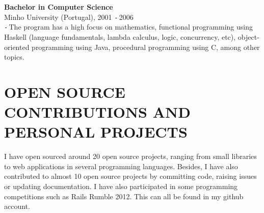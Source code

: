 \documentclass{res}
\def\Minus{\texttt{-}\,}
\begin{document}
\begin{resume}
    {\bf Bachelor in Computer Science}\\
    Minho University (Portugal), 2001 \Minus 2006\\
    \Minus The program has a high focus on mathematics, functional programming using Haskell (language fundamentals, lambda calculus, logic, concurrency, etc), object-oriented programming using Java, procedural programming using C, among other topics.


\section{OPEN SOURCE CONTRIBUTIONS AND PERSONAL PROJECTS}
\vspace{0.1in}

    I have open sourced around 20 open source projects, ranging from small libraries to web applications in several programming languages. Besides, I have also contributed to almost 10 open source projects by committing code, raising issues or updating documentation. I have also participated in some programming competitions such as Rails Rumble 2012. This can all be found in my github account.

\end{resume}
\end{document}
